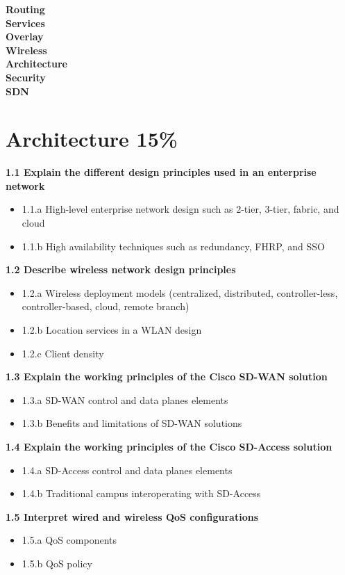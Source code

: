 \documentclass{article}
\begin{document}
\noindent\textbf{Routing}\\
\noindent\textbf{Services}\\
\noindent\textbf{Overlay}\\
\noindent\textbf{Wireless}\\
\noindent\textbf{Architecture}\\
\noindent\textbf{Security}\\
\noindent\textbf{SDN}\\

\newpage
\section{Architecture 15\%}
\textbf{1.1 Explain the different design principles used in an enterprise network}
\begin{itemize}
\item 1.1.a High-level enterprise network design such as 2-tier, 3-tier, fabric, and cloud
\item 1.1.b High availability techniques such as redundancy, FHRP, and SSO
\end{itemize}

\noindent\textbf{1.2 Describe wireless network design principles}
\begin{itemize}
\item 1.2.a Wireless deployment models (centralized, distributed, controller-less, controller-based, cloud, remote branch)
\item 1.2.b Location services in a WLAN design
\item 1.2.c Client density
\end{itemize}

\noindent\textbf{1.3 Explain the working principles of the Cisco SD-WAN solution}
\begin{itemize}
\item 1.3.a SD-WAN control and data planes elements
\item 1.3.b Benefits and limitations of SD-WAN solutions
\end{itemize}

\noindent\textbf{1.4 Explain the working principles of the Cisco SD-Access solution}
\begin{itemize}
\item 1.4.a SD-Access control and data planes elements
\item 1.4.b Traditional campus interoperating with SD-Access
\end{itemize}

\noindent\textbf{1.5 Interpret wired and wireless QoS configurations}
\begin{itemize}
\item 1.5.a QoS components
\item 1.5.b QoS policy
\end{itemize}
\end{document}
